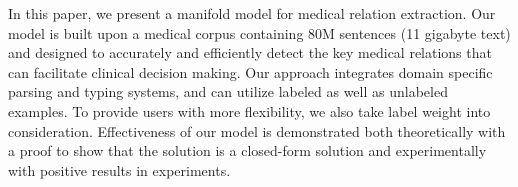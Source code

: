 In this paper, we present a manifold model for medical relation extraction. Our model is built upon a medical corpus containing 80M sentences (11 gigabyte text) and designed to accurately and efficiently detect the key medical relations that can facilitate clinical decision making. Our approach integrates domain specific parsing and typing systems, and can utilize labeled as well as unlabeled examples. To provide users with more flexibility, we also take label weight into consideration. Effectiveness of our model is demonstrated both theoretically with a proof to show that the solution is a closed-form solution and experimentally with positive results in experiments.
